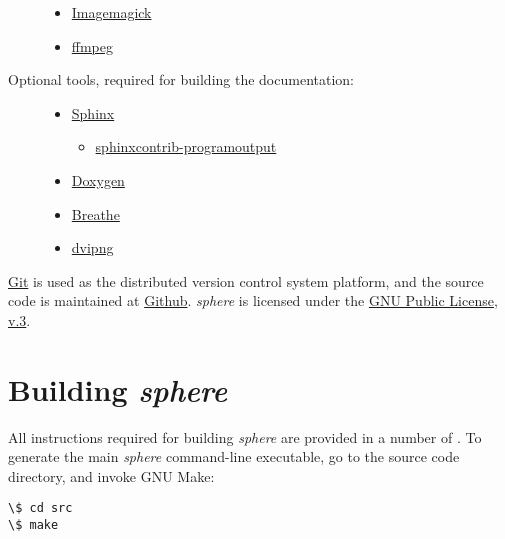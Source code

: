 \documentclass[letterpaper,10pt,english]{sphinxmanual}
\begin{document}
\begin{description}
\begin{itemize}
\item {} 
\href{http://www.imagemagick.org/script/index.php}{Imagemagick}

\item {} 
\href{http://ffmpeg.org/}{ffmpeg}

\end{itemize}

\item[{Optional tools, required for building the documentation:}] \leavevmode\begin{itemize}
\item {} 
\href{http://sphinx-doc.org}{Sphinx}
\begin{itemize}
\item {} 
\href{http://packages.python.org/sphinxcontrib-programoutput/}{sphinxcontrib-programoutput}

\end{itemize}

\item {} 
\href{http://www.stack.nl/~dimitri/doxygen/}{Doxygen}

\item {} 
\href{http://michaeljones.github.com/breathe/}{Breathe}

\item {} 
\href{http://www.nongnu.org/dvipng/}{dvipng}

\end{itemize}

\end{description}

\href{http://git-scm.com}{Git} is used as the distributed version control system platform, and the source code is maintained at \href{https://github.com/anders-dc/sphere/}{Github}. \emph{sphere} is licensed under the \href{https://www.gnu.org/licenses/gpl.html}{GNU Public License, v.3}.


\section{Building \emph{sphere}}
\label{introduction:building-sphere}
All instructions required for building \emph{sphere} are provided in a number of . To generate the main \emph{sphere} command-line executable, go to the source code directory, and invoke GNU Make:

\begin{Verbatim}[commandchars=\\\{\}]
\$ cd src
\$ make
\end{Verbatim}
\end{document}

